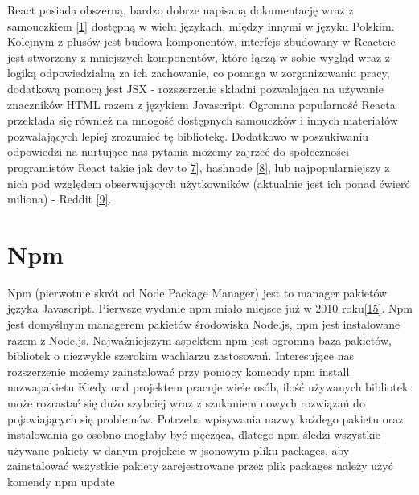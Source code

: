 \documentclass[oneside,polski,logo,indent]{amuthesis}
\begin{document}
\begin{enumerate}
\begin{enumerate}
{React posiada obszerną, bardzo dobrze napisaną dokumentację wraz z samouczkiem \hyperlink{[1]}{[1]} dostępną w wielu językach, między innymi w języku Polskim.
Kolejnym z plusów jest budowa komponentów, interfejs zbudowany w Reactcie jest stworzony z mniejszych komponentów, które łączą w sobie wygląd wraz z logiką odpowiedzialną za ich zachowanie, co pomaga w zorganizowaniu pracy, dodatkową pomocą jest JSX - rozszerzenie składni pozwalająca na używanie znaczników HTML razem z językiem Javascript.
Ogromna popularność Reacta przekłada się również na mnogość dostępnych samouczków i innych materiałów pozwalających lepiej zrozumieć tę bibliotekę. Dodatkowo w poszukiwaniu odpowiedzi na nurtujące nas pytania możemy zajrzeć do społeczności programistów React takie jak dev.to \hyperlink{[7]}{7]}, hashnode \hyperlink{[8]}{[8]}, lub najpopularniejszy z nich pod względem obserwujących użytkowników (aktualnie jest ich ponad ćwierć miliona) - Reddit \hyperlink{[9]}{[9]}.

}



\section{Npm}{

Npm (pierwotnie skrót od Node Package Manager) jest to manager pakietów języka Javascript. Pierwsze wydanie npm miało miejsce już w 2010 roku\hyperlink{[15]}{[15]}.
Npm jest domyślnym managerem pakietów środowiska Node.js, npm jest instalowane razem z Node.js. Najważniejszym aspektem npm jest ogromna baza pakietów, bibliotek o 
niezwykle szerokim wachlarzu zastosowań. Interesujące nas rozszerzenie możemy zainstalować przy pomocy komendy
\newline
npm install nazwapakietu
\newline
Kiedy nad projektem pracuje wiele osób, ilość używanych bibliotek może rozrastać się dużo szybciej wraz z szukaniem nowych rozwiązań do pojawiających się problemów.
Potrzeba wpisywania nazwy każdego pakietu oraz instalowania go osobno mogłaby być męcząca, dlatego npm śledzi wszystkie używane pakiety w danym projekcie w jsonowym pliku
packages, aby zainstalować wszystkie pakiety zarejestrowane przez plik packages należy użyć komendy
\newline
npm update
\newline





}




\end{enumerate}
\end{enumerate}
\end{document}
